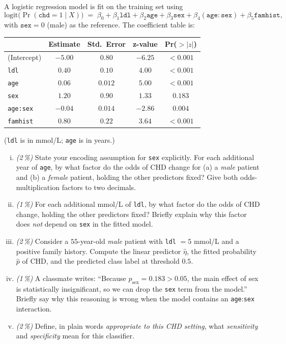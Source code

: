 \documentclass[11pt,a4paper]{article}
\newcommand{\subpoints}[1]{\textit{(#1\,\%)}}
\begin{document}
A logistic regression model is fit on the training set using
$$\text{logit}\bigl(\Pr(\texttt{chd} = 1 \mid X)\bigr)
   \;=\; \beta_0 + \beta_1 \texttt{ldl} + \beta_2 \texttt{age} + \beta_3 \texttt{sex} + \beta_4 (\texttt{age}\!:\!\texttt{sex}) + \beta_5 \texttt{famhist},$$
with $\texttt{sex} = 0$ (male) as the reference. The coefficient table is:

\begin{center}\small
\begin{tabular}{lcccc}
\toprule
 & \textbf{Estimate} & \textbf{Std.\ Error} & \textbf{z-value} & \textbf{Pr($>|z|$)} \\
\midrule
(Intercept)         & $-5.00$ & $0.80$ & $-6.25$ & $<0.001$ \\
\texttt{ldl}        & $0.40$  & $0.10$ & $4.00$  & $<0.001$ \\
\texttt{age}        & $0.06$  & $0.012$ & $5.00$  & $<0.001$ \\
\texttt{sex}        & $1.20$  & $0.90$ & $1.33$  & $0.183$  \\
\texttt{age:sex}    & $-0.04$ & $0.014$ & $-2.86$ & $0.004$  \\
\texttt{famhist}    & $0.80$  & $0.22$ & $3.64$  & $<0.001$ \\
\bottomrule
\end{tabular}
\end{center}

(\texttt{ldl} is in mmol/L; \texttt{age} is in years.)

\begin{enumerate}[(i)]
  \item \subpoints{2} State your encoding assumption for \texttt{sex} explicitly. For each additional year of \texttt{age}, by what factor do the odds of CHD change for (a) a \emph{male} patient and (b) a \emph{female} patient, holding the other predictors fixed? Give both odds-multiplication factors to two decimals.
  \item \subpoints{1} For each additional mmol/L of \texttt{ldl}, by what factor do the odds of CHD change, holding the other predictors fixed? Briefly explain why this factor does \emph{not} depend on \texttt{sex} in the fitted model.
  \item \subpoints{2} Consider a $55$-year-old \emph{male} patient with \texttt{ldl} $= 5$ mmol/L and a positive family history. Compute the linear predictor $\hat\eta$, the fitted probability $\hat p$ of CHD, and the predicted class label at threshold $0.5$.
  \item \subpoints{1} A classmate writes: ``Because $p_{\text{sex}} = 0.183 > 0.05$, the main effect of sex is statistically insignificant, so we can drop the \texttt{sex} term from the model.'' Briefly say why this reasoning is wrong when the model contains an \texttt{age}\!:\!\texttt{sex} interaction.
  \item \subpoints{2} Define, in plain words \emph{appropriate to this CHD setting}, what \emph{sensitivity} and \emph{specificity} mean for this classifier.
\end{enumerate}
\end{document}
